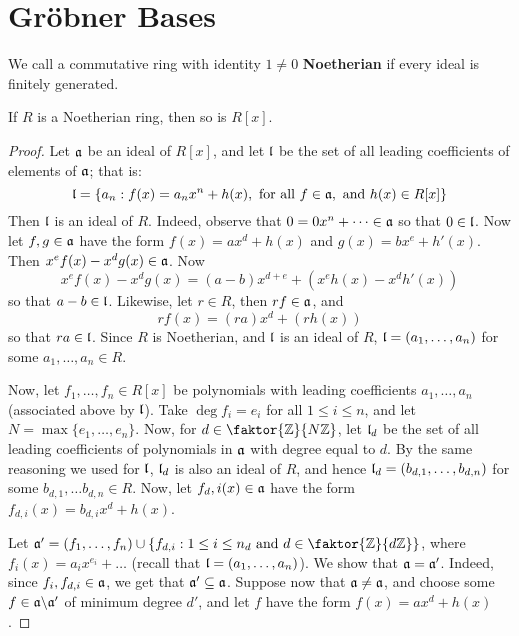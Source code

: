 \section{Gr\"obner Bases}
\label{section_7.5}

\begin{definition}
  We call a commutative ring with identity $1 \neq 0$
  \textbf{Noetherian} if every ideal is finitely generated.
\end{definition}

\begin{theorem}\label{theorem_7.5.1}
  If $R$ is a Noetherian ring, then so is $R[x]$.
\end{theorem}
\begin{proof}
  Let $\mathfrak{a}$ be an ideal of $R[x]$, and let $\mathfrak{l}$ be the set of all
  leading coefficients of elements of $\mathfrak{a}$; that is:
  \begin{equation*}
    \mathfrak{l}=\{ a_n : f(x)=a_nx^n+h(x), \text{ for all }
    f \in \mathfrak{a}, \text{ and } h(x) \in R[x]  \}
  \end{equation*}
  Then $\mathfrak{l}$ is an ideal of $R$. Indeed, observe that $0=0x^n+\dots
  \in \mathfrak{a}$ so that $0 \in \mathfrak{l}$. Now let $f,g \in \mathfrak{a}$ have the
  form $f(x)=ax^d+h(x)$ and $g(x)=bx^e+h'(x)$. Then $x^ef(x)-x^dg(x)
  \in \mathfrak{a}$. Now
  \begin{equation*}
    x^ef(x)-x^dg(x)=(a-b)x^{d+e}+(x^eh(x)-x^dh'(x))
  \end{equation*}
  so that $a-b \in \mathfrak{l}$. Likewise, let $r \in R$, then $rf \in \mathfrak{a}$,
  and
  \begin{equation*}
    rf(x)=(ra)x^d+(rh(x))
  \end{equation*}
  so that $ra \in \mathfrak{l}$. Since $R$ is Noetherian, and $\mathfrak{l}$ is an ideal
  of $R$,  $\mathfrak{l}=(a_1, \dots, a_n)$ for some $a_1, \dots, a_n \in R$.

  Now, let $f_1, \dots, f_n \in R[x]$ be polynomials with leading
  coefficients $a_1, \dots, a_n$ (associated above by $\mathfrak{l}$). Take
  $\deg{f_i}=e_i$ for all $1 \leq i \leq n$, and let $N=\max{\{e_1,
  \dots, e_n\}}$. Now, for $d \in \faktor{\Z}{N\Z}$, let $\mathfrak{l}_d$ be
  the set of all leading coefficients of polynomials in $\mathfrak{a}$ with
  degree equal to $d$. By the same reasoning we used for $\mathfrak{l}$,
  $\mathfrak{l}_d$ is also an ideal of $R$, and hence $\mathfrak{l}_d=(b_{d,1}, \dots,
  b_{d,n})$ for some $b_{d,1}, \dots b_{d,n} \in R$. Now, let
  $f_d,i(x) \in \mathfrak{a}$ have the form $f_{d,i}(x)=b_{d,i}x^d+h(x)$.

  Let $\af'=(f_1, \dots, f_n) \cup \{f_{d,i} : 1 \leq i \leq n_d
  \text{ and } d \in \faktor{\Z}{d\Z}\}$, where
  $f_i(x)=a_ix^{e_i}+\dots$ (recall that $\mathfrak{l}=(a_1, \dots, a_n)$). We
  show that $\mathfrak{a}=\mathfrak{a}'$. Indeed, since $f_i,f_{d,i} \in \mathfrak{a}$, we get
  that $\mathfrak{a}' \subseteq \mathfrak{a}$. Suppose now that $\mathfrak{a} \neq \mathfrak{a}$, and
  choose some $f \in \mathfrak{a} \backslash \mathfrak{a}'$ of minimum degree $d'$, and let
  $f$ have the form $f(x)=ax^d+h(x)$.


\end{proof}
